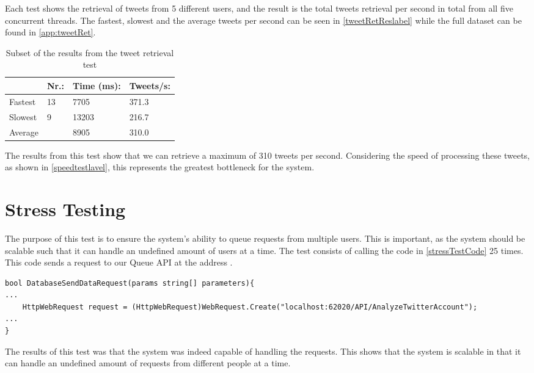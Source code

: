 Each test shows the retrieval of tweets from 5 different users, and the result
is the total tweets retrieval per second in total from all five concurrent
threads. The fastest, slowest and the average tweets per second can be seen in
\autoref{tweetRetReslabel} while the full dataset can be found in
\autoref{app:tweetRet}.

\begin{table}[H]\centering
\begin{tabular}{|l|l|l|l|}
\hline
\textbf{} & \textbf{Nr.:}	&	\textbf{Time (ms):}	&	\textbf{Tweets/s:} \\\hline
Fastest & 13	&	7705	&	371.3\\\hline
Slowest & 9	&	13203	&	216.7\\\hline
Average & 	&	8905	&	310.0 \\\hline
\end{tabular}
\caption{Subset of the results from the tweet retrieval test}
\label{tweetRetReslabel}
\end{table}

The results from this test show that we can retrieve a maximum of 310 tweets per
second. Considering the speed of processing these tweets, as shown in
\autoref{speedtestlavel}, this represents the greatest bottleneck for the
system.
 
\section{Stress Testing}
The purpose of this test is to ensure the system's ability to queue requests
from multiple users. This is important, as the system should be scalable such
that it can handle an undefined amount of users at a time. The test consists of
calling the code in \autoref{stressTestCode} 25 times. This code sends a request
to our Queue API at the address .\nl

\begin{minipage}[H]{\linewidth}
\begin{lstlisting}[caption = Code initiating the stress test, label = stressTestCode] 
bool DatabaseSendDataRequest(params string[] parameters){
...
	HttpWebRequest request = (HttpWebRequest)WebRequest.Create("localhost:62020/API/AnalyzeTwitterAccount");
...
}
\end{lstlisting}
\end{minipage}

The results of this test was that the system was indeed capable of handling the
requests. This shows that the system is scalable in that it can handle an
undefined amount of requests from different people at a time.


